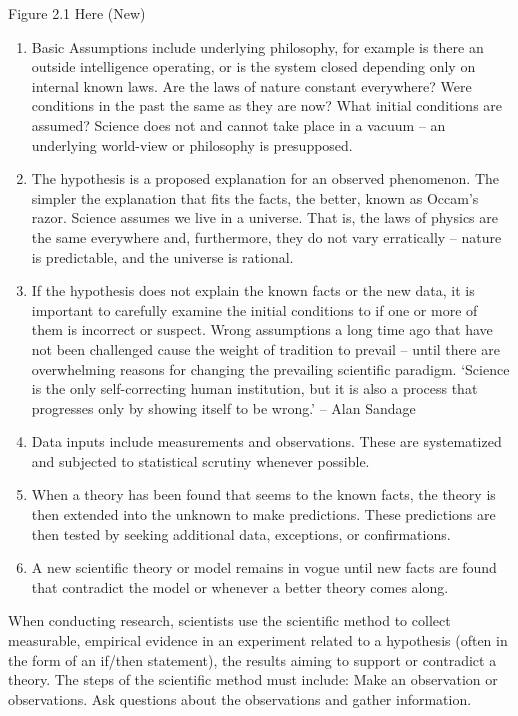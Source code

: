 Figure 2.1 Here (New)

\begin{enumerate}
\item Basic Assumptions include underlying philosophy, for example is there an outside intelligence operating, or is the system closed depending only on internal known laws. Are the laws of nature constant everywhere?  Were conditions in the past the same as they are now?  What initial conditions are assumed?  Science does not and cannot take place in a vacuum – an underlying world-view or philosophy is presupposed.
\item The hypothesis is a proposed explanation for an observed phenomenon. The simpler the explanation that fits the facts, the better, known as Occam’s razor. Science assumes we live in a universe. That is, the laws of physics are the same everywhere and, furthermore, they do not vary erratically – nature is predictable, and the universe is rational.
\item If the hypothesis does not explain the known facts or the new data, it is important to carefully examine the initial conditions to if one or more of them is incorrect or suspect. Wrong assumptions a long time ago that have not been challenged cause the weight of tradition to prevail – until there are overwhelming reasons for changing the prevailing scientific paradigm.
‘Science is the only self-correcting human institution, but it is also a process that progresses only by showing itself to be wrong.’ – Alan Sandage
\item Data inputs include measurements and observations. These are systematized and subjected to statistical scrutiny whenever possible.
\item When a theory has been found that seems to the known facts, the theory is then extended into the unknown to make predictions. These predictions are then tested by seeking additional data, exceptions, or confirmations.
\item A new scientific theory or model remains in vogue until new facts are found that contradict the model or whenever a better theory comes along.
\end{enumerate}

When conducting research, scientists use the scientific method to collect measurable, empirical evidence in an experiment related to a hypothesis (often in the form of an if/then statement), the results aiming to support or contradict a theory.
The steps of the scientific method must include: 
Make an observation or observations.
Ask questions about the observations and gather information.

